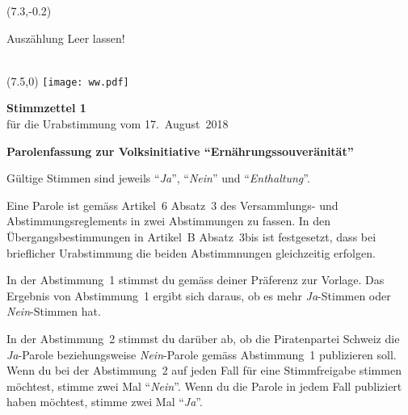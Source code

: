 \documentclass[11pt, a4paper]{scrartcl}
\newcommand{\votingdate}{17.~August~2018}
\newcommand{\ja}{\enquote{\textit{Ja}}}
\newcommand{\nein}{\enquote{\textit{Nein}}}
\newcommand{\enthaltung}{\enquote{\textit{Enthaltung}}}
\begin{document}
{\begin{minipage}[t][12.5cm][t]{\textwidth}
\begin{textblock}{6}(7.3,-0.2)
\begin{framed}
Auszählung \hfill Leer lassen! \\
\vspace{1.5cm} ~ \\
\end{framed}
\end{textblock}


\end{minipage}

\newpage

\begin{minipage}[t][12.5cm][t]{17.7cm}

\begin{textblock}{6}(7.5,0)
\texttt{[image: ww.pdf]}
\end{textblock}

{\LARGE\textbf{Stimmzettel 1}} \\
für die Urabstimmung vom \votingdate{} \\

\vspace{2cm}

\textbf{Parolenfassung zur Volksinitiative \enquote{Ernährungssouveränität}}

\vspace{0.2cm}
Gültige Stimmen sind jeweils \ja{}, \nein{} und \enthaltung{}.

\vspace{0.2cm}
Eine Parole ist gemäss Artikel~6 Absatz~3 des Versammlungs- und Abstimmungsreglements in zwei Abstimmungen zu fassen. In den Übergangsbestimmungen in Artikel~B Absatz~3bis ist festgesetzt, dass bei brieflicher Urabstimmung die beiden Abstimmnungen gleichzeitig erfolgen.

\vspace{0.2cm}
In der Abstimmung~1 stimmst du gemäss deiner Präferenz zur Vorlage. Das Ergebnis von Abstimmung~1 ergibt sich daraus, ob es mehr \textit{Ja}-Stimmen oder \textit{Nein}-Stimmen hat. 

\vspace{0.2cm}
In der Abstimmung~2 stimmst du darüber ab, ob die Piratenpartei Schweiz die \textit{Ja}-Parole beziehungsweise \textit{Nein}-Parole gemäss Abstimmung~1 publizieren soll. Wenn du bei der Abstimmung~2 auf jeden Fall für eine Stimmfreigabe stimmen möchtest, stimme zwei Mal \nein{}. Wenn du die Parole in jedem Fall publiziert haben möchtest, stimme zwei Mal \ja{}.


\end{minipage}}
\end{document}
